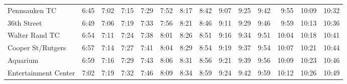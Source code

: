 \begin{center}
\begin{tabular}{@{}lrrrrrrrrrrrrr@{}}
Pennsauken TC & 6:45 & 7:02 & 7:15 & 7:29 & 7:52 & 8:17 & 8:42 & 9:07 & 9:25 & 9:42 & 9:55 & 10:09 & 10:32 \\
36th Street & 6:49 & 7:06 & 7:19 & 7:33 & 7:56 & 8:21 & 8:46 & 9:11 & 9:29 & 9:46 & 9:59 & 10:13 & 10:36 \\
Walter Rand TC & 6:54 & 7:11 & 7:24 & 7:38 & 8:01 & 8:26 & 8:51 & 9:16 & 9:34 & 9:51 & 10:04 & 10:18 & 10:41 \\
Cooper St/Rutgers & 6:57 & 7:14 & 7:27 & 7:41 & 8:04 & 8:29 & 8:54 & 9:19 & 9:37 & 9:54 & 10:07 & 10:21 & 10:44 \\
Aquarium & 6:59 & 7:16 & 7:29 & 7:43 & 8:06 & 8:31 & 8:56 & 9:21 & 9:39 & 9:56 & 10:09 & 10:23 & 10:46 \\
Entertainment Center & 7:02 & 7:19 & 7:32 & 7:46 & 8:09 & 8:34 & 8:59 & 9:24 & 9:42 & 9:59 & 10:12 & 10:26 & 10:49 \\
\bottomrule\end{tabular}\end{center}
